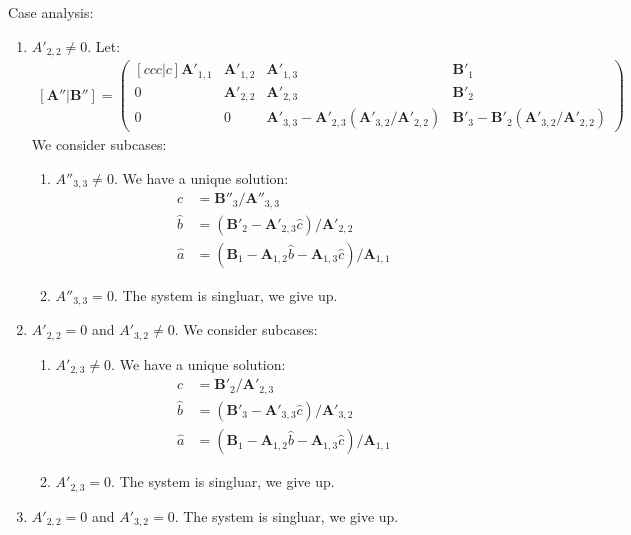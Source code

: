 \documentclass{article}
\begin{document}
Case analysis:
\begin{enumerate}

\item $A'_{2,2} \neq 0$. Let:
\begin{align*}
\left[ \bm{A}'' | \bm{B}'' \right] =
\begin{pmatrix}[ccc|c]
\bm{A}'_{1,1} &
\bm{A}'_{1,2} &
\bm{A}'_{1,3} &
\bm{B}'_1
\\
0 &
\bm{A}'_{2,2} &
\bm{A}'_{2,3} &
\bm{B}'_2
\\
0 &
0 &
\bm{A}'_{3,3} - \bm{A}'_{2,3} \left( \bm{A}'_{3,2} / \bm{A}'_{2,2} \right) &
\bm{B}'_3 - \bm{B}'_2 \left( \bm{A}'_{3,2} / \bm{A}'_{2,2} \right)
\end{pmatrix}
\end{align*}
We consider subcases:
\begin{enumerate}
\item $A''_{3,3} \neq 0$. We have a unique solution:
\begin{align*}
\hat{c} & = \bm{B}''_3 / \bm{A}''_{3,3}
\\
\hat{b} & = \left( \bm{B}'_2 - \bm{A}'_{2,3} \hat{c} \right) / \bm{A}'_{2,2}
\\
\hat{a} & = \left( \bm{B}_1 - \bm{A}_{1,2} \hat{b} - \bm{A}_{1,3} \hat{c} \right) / \bm{A}_{1,1}
\end{align*}

\item $A''_{3,3} = 0$. The system is singluar, we give up.
\end{enumerate}

\item $A'_{2,2} = 0$ and $A'_{3,2} \neq 0$. We consider subcases:
\begin{enumerate}
\item $A'_{2,3} \neq 0$. We have a unique solution:
\begin{align*}
\hat{c} & = \bm{B}'_2 / \bm{A}'_{2,3}
\\
\hat{b} & = \left( \bm{B}'_3 - \bm{A}'_{3,3} \hat{c} \right) / \bm{A}'_{3,2}
\\
\hat{a} & = \left( \bm{B}_1 - \bm{A}_{1,2} \hat{b} - \bm{A}_{1,3} \hat{c} \right) / \bm{A}_{1,1}
\end{align*}

\item $A'_{2,3} = 0$. The system is singluar, we give up.
\end{enumerate}

\item $A'_{2,2} = 0$ and $A'_{3,2} = 0$. The system is singluar, we give up.
\end{enumerate}
\end{document}
